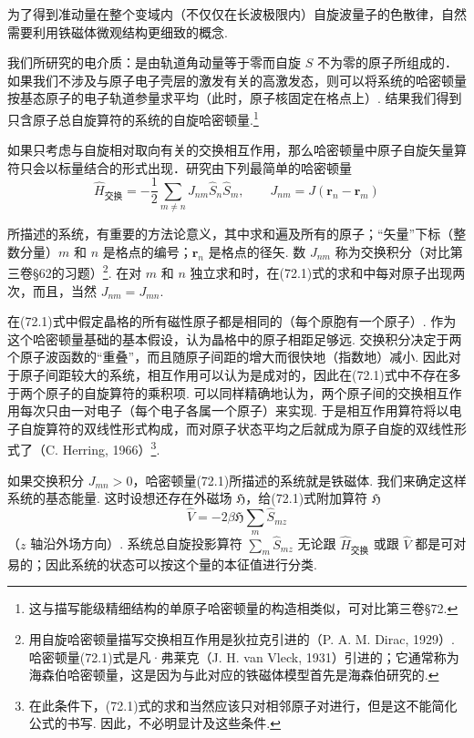 为了得到准动量在整个变域内（不仅仅在长波极限内）自旋波量子的色散律，自然需要利用铁磁体微观结构更细致的概念.

我们所研究的电介质：是由轨道角动量等于零而自旋 $S$ 不为零的原子所组成的．如果我们不涉及与原子电子壳层的激发有关的高激发态，则可以将系统的哈密顿量按基态原子的电子轨道参量求平均（此时，原子核固定在格点上）. 结果我们得到只含原子总自旋算符的系统的自旋哈密顿量.\footnote{这与描写能级精细结构的单原子哈密顿量的构造相类似，可对比第三卷§72.}

如果只考虑与自旋相对取向有关的交换相互作用，那么哈密顿量中原子自旋矢量算符只会以标量结合的形式出现．研究由下列最简单的哈密顿量
\begin{equation}
\hat{H}_{\text{交换}}=-\frac{1}{2}\sum_{m\neq n}J_{nm}\hat{S}_n\hat{S}_m,
\qquad J_{nm}=J(\bm{r}_n-\bm{r}_m)
\end{equation}

所描述的系统，有重要的方法论意义，其中求和遍及所有的原子；“矢量”下标（整数分量）$m$ 和 $n$ 是格点的编号；$\bm{r}_n$ 是格点的径矢. 数 $J_{nm}$ 称为交换积分（对比第三卷§62的习题）\footnote{用自旋哈密顿量描写交换相互作用是狄拉克引进的（P. A. M. Dirac, 1929）. 哈密顿量(72.1)式是凡·弗莱克（J. H. van Vleck, 1931）引进的；它通常称为海森伯哈密顿量，这是因为与此对应的铁磁体模型首先是海森伯研究的.}. 在对 $m$ 和 $n$ 独立求和时，在(72.1)式的求和中每对原子出现两次，而且，当然 $J_{nm}=J_{mn}$.

在(72.1)式中假定晶格的所有磁性原子都是相同的（每个原胞有一个原子）. 作为这个哈密顿量基础的基本假设，认为晶格中的原子相距足够远. 交换积分决定于两个原子波函数的“重叠”，而且随原子间距的增大而很快地（指数地）减小. 因此对于原子间距较大的系统，相互作用可以认为是成对的，因此在(72.1)式中不存在多于两个原子的自旋算符的乘积项. 可以同样精确地认为，两个原子间的交换相互作用每次只由一对电子（每个电子各属一个原子）来实现. 于是相互作用算符将以电子自旋算符的双线性形式构成，而对原子状态平均之后就成为原子自旋的双线性形式了（C. Herring, 1966）\footnote{在此条件下，(72.1)式的求和当然应该只对相邻原子对进行，但是这不能简化公式的书写. 因此，不必明显计及这些条件.}.

如果交换积分 $J_{mn}>0$，哈密顿量(72.1)所描述的系统就是铁磁体. 我们来确定这样系统的基态能量. 这时设想还存在外磁场 $\mathfrak{H}$，给(72.1)式附加算符 $\mathfrak{H}$
\begin{equation}
\hat{V}=-2\beta\mathfrak{H}\sum_m\hat{S}_{mz}
\end{equation}
（$z$ 轴沿外场方向）. 系统总自旋投影算符 $\sum_m\hat{S}_{mz}$ 无论跟 $\hat{H}_{\text{交换}}$ 或跟 $\hat{V}$ 都是可对易的；因此系统的状态可以按这个量的本征值进行分类.

